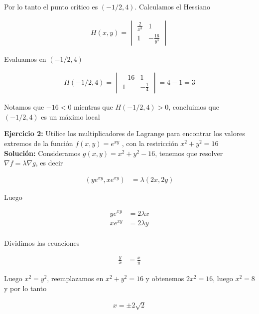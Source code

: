 \documentclass[a4paper]{article}
\begin{document}
Por lo tanto el punto crítico es $(-1/2, 4)$. Calculamos el Hessiano

\begin{align*}
    H(x,y) = \begin{vmatrix}
        \frac{2}{x^3} & 1 \\
        1  &  -\frac{16}{y^3}
    \end{vmatrix}
\end{align*}

Evaluamos en $(-1/2, 4)$

\begin{align*}
    H(-1/2,4) = \begin{vmatrix}
        -16 & 1 \\
        1  &  -\frac{1}{4}
    \end{vmatrix} = 4-1 =3
\end{align*}

Notamos que $-16 < 0$ mientras que $ H(-1/2,4)  > 0$, concluimos que $(-1/2,4)$ es un máximo local







\newpage



\textbf{Ejercicio 2:} Utilice los multiplicadores de Lagrange para encontrar los valores extremos de la función $f(x,y)=e^{xy}$ , con la restricción $x^2+y^2=16$ \\

\textbf{Solución: }Consideramos $g(x,y)= x^2+y^2-16$, tenemos que resolver $\nabla f = \lambda \nabla g$, es decir

\begin{align*}
    (ye^{xy},xe^{xy}) &= \lambda(2x,2y)
\end{align*}

Luego

\begin{align*}
    ye^{xy} &= 2\lambda x \\
    xe^{xy} &= 2\lambda y \\
\end{align*}

Dividimos las ecuaciones


\begin{align*}
   \frac{y}{x} &= \frac{x}{y}
\end{align*}

Luego $x^2=y^2$, reemplazamos en $x^2+y^2=16$ y obtenemos $2x^2=16$, luego $x^2=8$ y por lo tanto

\begin{align*}
    x=\pm 2\sqrt{2}
\end{align*}
\end{document}
